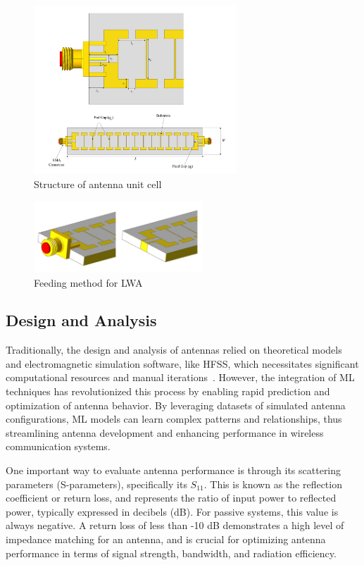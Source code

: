 \documentclass[conference]{IEEEtran}
\begin{document}
\begin{figure}[h]
\begin{center}
\noindent
    \includegraphics[width=3in]{LWA.png}
    \caption{Structure of antenna unit cell}
    \label{LWA}
\end{center}
\end{figure}

\begin{figure}[h]
\begin{center}
\noindent
    \includegraphics[width=2.5in]{Feeding Method.jpg}
    \caption{Feeding method for LWA}
    \label{LWA_feed}
\end{center}
\end{figure}

\subsection{Design and Analysis}
Traditionally, the design and analysis of antennas relied on theoretical models and electromagnetic simulation software, like HFSS, which necessitates significant computational resources and manual iterations~\cite{john_antenna_2009,ranjan_design_2023,liu_efficient_2014}. However, the integration of ML techniques has revolutionized this process by enabling rapid prediction and optimization of antenna behavior. By leveraging datasets of simulated antenna configurations, ML models can learn complex patterns and relationships, thus streamlining antenna development and enhancing performance in wireless communication systems.

One important way to evaluate antenna performance is through its scattering parameters (S-parameters), specifically its $S_{11}$. This is known as the reflection coefficient or return loss, and represents the ratio of input power to reflected power, typically expressed in decibels (dB). For passive systems, this value is always negative. A return loss of less than -10 dB demonstrates a high level of impedance matching for an antenna, and is crucial for optimizing antenna performance in terms of signal strength, bandwidth, and radiation efficiency. 
\end{document}

